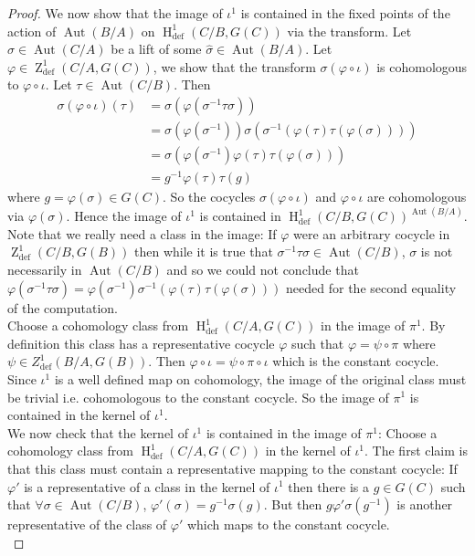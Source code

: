 \documentclass[10pt,a4paper]{amsart}
\DeclareMathOperator{\HH}{H} %
\DeclareMathOperator{\ZZ}{Z} %
\DeclareMathOperator{\aut}{Aut} %
\DeclareMathOperator{\defin}{def} %
\begin{document}
\begin{proof}
We now show that the image of $\iota^1$ is contained in the fixed points of the action of $\aut(B/A)$ on $\HH^1_{\defin}(C/B,G(C))$ via the transform. Let $\sigma \in \aut(C/A)$ be a lift of some $\hat{\sigma} \in \aut(B/A)$. Let $\varphi \in \ZZ^1_{\defin}(C/A,G(C))$, we show that the transform $\sigma(\varphi\circ\iota)$ is cohomologous to $\varphi\circ\iota$. Let $\tau \in \aut(C/B)$. Then
\begin{align*}
    \sigma(\varphi\circ\iota)(\tau) &= \sigma(\varphi(\sigma^{-1}\tau\sigma))\\
    &= \sigma(\varphi(\sigma^{-1}))\sigma(\sigma^{-1}(\varphi(\tau)\tau(\varphi(\sigma))))\\
    &= \sigma(\varphi(\sigma^{-1})\varphi(\tau)\tau(\varphi(\sigma)))\\
    &= g^{-1}\varphi(\tau)\tau(g)
\end{align*}
where $g = \varphi(\sigma) \in G(C)$. So the cocycles $\sigma(\varphi\circ\iota)$ and $\varphi\circ\iota$ are cohomologous via $\varphi(\sigma)$. Hence the image of $\iota^1$ is contained in $\HH^1_{\defin}(C/B,G(C))^{\aut(B/A)}$. Note that we really need a class in the image: If $\varphi$ were an arbitrary cocycle in $\ZZ^1_{\defin}(C/B,G(B))$ then while it is true that $\sigma^{-1}\tau\sigma \in \aut(C/B)$, $\sigma$ is not necessarily in $\aut(C/B)$ and so we could not conclude that $\varphi(\sigma^{-1}\tau\sigma) = \varphi(\sigma^{-1})\sigma^{-1}(\varphi(\tau)\tau(\varphi(\sigma)))$ needed for the second equality of the computation.\\

Choose a cohomology class from $\HH^1_{\defin}(C/A,G(C))$ in the image of $\pi^1$. By definition this class has a representative cocycle $\varphi$ such that $\varphi = \psi \circ \pi$ where $\psi \in Z^1_{\defin}(B/A,G(B))$. Then $\varphi\circ \iota = \psi \circ \pi\circ \iota$ which is the constant cocycle. Since $\iota^1$ is a well defined map on cohomology, the image of the original class must be trivial i.e. cohomologous to the constant cocycle. So the image of $\pi^1$ is contained in the kernel of $\iota^1$. \\

We now check that the kernel of $\iota^1$ is contained in the image of $\pi^1$: Choose a cohomology class from $\HH^1_{\defin}(C/A,G(C))$ in the kernel of $\iota^1$. The first claim is that this class must contain a representative mapping to the constant cocycle: If $\varphi'$ is a representative of a class in the kernel of $\iota^1$ then there is a $g \in G(C)$ such that $\forall \sigma \in \aut(C/B)$, $\varphi'(\sigma) = g^{-1}\sigma(g)$. But then $g\varphi'\sigma(g^{-1})$ is another representative of the class of $\varphi'$ which maps to the constant cocycle.\\


\end{proof}
\end{document}
